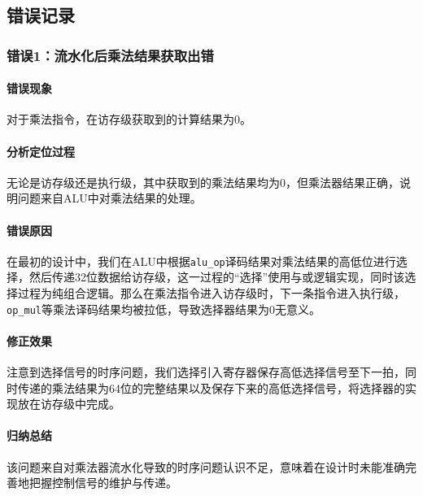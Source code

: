 \documentclass[UTF-8,twoside,c5size]{ctexart}
\begin{document}
	\subsection{错误记录}	
	\subsubsection{错误\textbf{1：}流水化后乘法结果获取出错}
	\paragraph{错误现象}\hfill
	
	
	对于乘法指令，在访存级获取到的计算结果为0。
	
	\paragraph{分析定位过程}\hfill
	
	无论是访存级还是执行级，其中获取到的乘法结果均为0，但乘法器结果正确，说明问题来自ALU中对乘法结果的处理。
	
	\paragraph{错误原因}\hfill
	
	在最初的设计中，我们在ALU中根据\texttt{alu\_op}译码结果对乘法结果的高低位进行选择，然后传递32位数据给访存级，这一过程的“选择”使用与或逻辑实现，同时该选择过程为纯组合逻辑。那么在乘法指令进入访存级时，下一条指令进入执行级，\texttt{op\_mul}等乘法译码结果均被拉低，导致选择器结果为0无意义。
	
	\paragraph{修正效果}\hfill
	
	注意到选择信号的时序问题，我们选择引入寄存器保存高低选择信号至下一拍，同时传递的乘法结果为64位的完整结果以及保存下来的高低选择信号，将选择器的实现放在访存级中完成。
			
	\paragraph{归纳总结}\hfill
			
	该问题来自对乘法器流水化导致的时序问题认识不足，意味着在设计时未能准确完善地把握控制信号的维护与传递。
	
\end{document}
